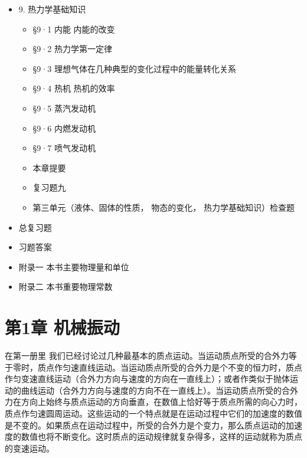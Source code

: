\begin{itemize}
  \begin{itemize}
  \tightlist
  \item
    §8·1 熔解和凝固
  \item
    §8·2 蒸发 饱和汽
  \item
    §8·3 沸腾 汽化热
  \item
    §8·4 气体的液化
  \item
    §8·5 大气的湿度 露点
  \item
    本章提要
  \item
    复习题八
  \end{itemize}
\item
  9. 热力学基础知识

  \begin{itemize}
  \tightlist
  \item
    §9·1 内能 内能的改变
  \item
    §9·2 热力学第一定律
  \item
    §9·3 理想气体在几种典型的变化过程中的能量转化关系
  \item
    §9·4 热机 热机的效率
  \item
    §9·5 蒸汽发动机
  \item
    §9·6 内燃发动机
  \item
    §9·7 喷气发动机
  \item
    本章提要
  \item
    复习题九
  \item
    第三单元（液体、固体的性质， 物态的变化， 热力学基础知识）检查题
  \end{itemize}
\item
  总复习题
\item
  习题答案
\item
  附录一 本书主要物理量和单位
\item
  附录二 本书重要物理常数
\end{itemize}

\chapter{第1章 机械振动}\label{ux7b2c1ux7ae0-ux673aux68b0ux632fux52a8}

在第一册里
我们已经讨论过几种最基本的质点运动。当运动质点所受的合外力等于零时，质点作匀速直线运动。当运动质点所受的合外力是个不变的恒力时，质点作匀变速直线运动（合外力方向与速度的方向在一直线上）；或者作类似于抛体运动的曲线运动（合外力方向与速度的方向不在一直线上）。当运动质点所受的合外力在方向上始终与质点运动的方向垂直，在数值上恰好等于质点所需的向心力时，质点作匀速圆周运动。这些运动的一个特点就是在运动过程中它们的加速度的数值是不变的。如果质点在运动过程中，所受的合外力是个变力，那么质点运动的加速度的数值也将不断变化。这时质点的运动规律就复杂得多，这样的运动就称为质点的变速运动。

